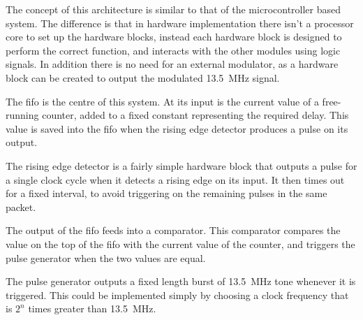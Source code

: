 The concept of this architecture is similar to that of the microcontroller based system. The difference is that in hardware implementation there isn't a processor core to set up the hardware blocks, instead each hardware block is designed to perform the correct function, and interacts with the other modules using logic signals. In addition there is no need for an external modulator, as a hardware block can be created to output the modulated \SI{13.5}{\mega\hertz} signal.

The \gls{fifo} is the centre of this system. At its input is the current value of a free-running counter, added to a fixed constant representing the required delay. This value is saved into the \gls{fifo} when the rising edge detector produces a pulse on its output.

The rising edge detector is a fairly simple hardware block that outputs a pulse for a single clock cycle when it detects a rising edge on its input. It then times out for a fixed interval, to avoid triggering on the remaining pulses in the same packet.

The output of the \gls{fifo} feeds into a comparator. This comparator compares the value on the top of the \gls{fifo} with the current value of the counter, and triggers the pulse generator when the two values are equal.

The pulse generator outputs a fixed length burst of \SI{13.5}{\mega\hertz} tone whenever it is triggered. This could be implemented simply by choosing a clock frequency that is $2^n$ times greater than \SI{13.5}{\mega\hertz}.

